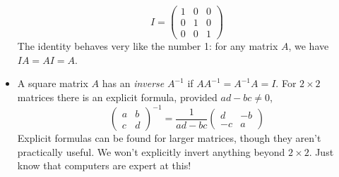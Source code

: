\begin{itemize}
  \[I=\begin{pmatrix}
  1&0&0\\0&1&0\\0&0&1
  \end{pmatrix}\]
  The identity behaves very like the number 1: for any matrix $A$, we have $IA=AI=A$.
  \item A square matrix $A$ has an \emph{inverse} $A^{-1}$ if
  $AA^{-1}=A^{-1}A=I$.
  For $2\times 2$ matrices there is an explicit formula, provided $ad-bc\neq 0$,
  \[\begin{pmatrix}
  a&b\\c&d
  \end{pmatrix}^{-1}
  =\frac 1{ad-bc}\begin{pmatrix}
  d&-b\\-c&a
  \end{pmatrix}
  \]
  Explicit formulas can be found for larger matrices, though they aren't practically useful. We won't explicitly invert anything beyond $2\times 2$. Just know that computers are expert at this!
\end{itemize}
\fi

